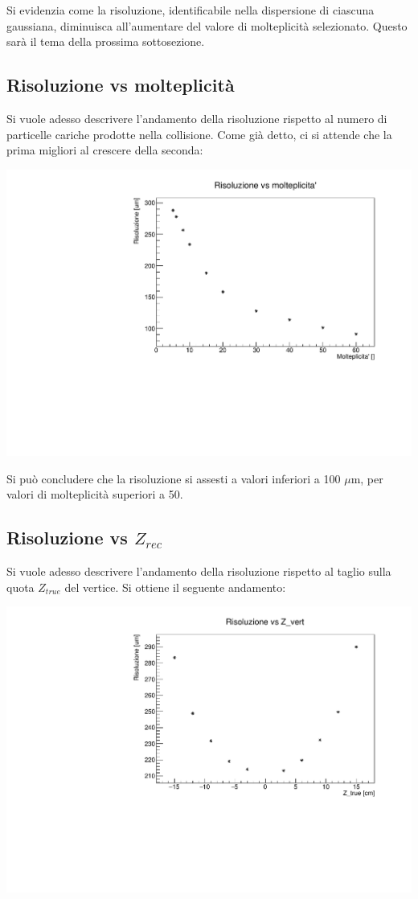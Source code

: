 \documentclass{article}
\begin{document}
\begin{figure} [H]
    \label{fig:foobar}
\end{figure}

Si evidenzia come la risoluzione, identificabile nella dispersione di ciascuna gaussiana, diminuisca all'aumentare del valore di molteplicità selezionato. Questo sarà il tema della prossima sottosezione. 

\subsection{Risoluzione vs molteplicità}
Si vuole adesso descrivere l'andamento della risoluzione rispetto al numero di particelle cariche prodotte nella collisione. Come già detto, ci si attende che la prima migliori al crescere della seconda:

\begin{center}
    	\includegraphics[width=0.55\linewidth]{images/ris_vs_mul.pdf}
\end{center}

Si può concludere che la risoluzione si assesti a valori inferiori a 100 $\mu$m, per valori di molteplicità superiori a 50.

\subsection{Risoluzione vs $Z_{rec}$}
Si vuole adesso descrivere l'andamento della risoluzione rispetto al taglio sulla quota $Z_{true}$ del vertice. Si ottiene il seguente andamento: 

\begin{center}
    	\includegraphics[width=0.55\linewidth]{images/ris_vs_Z.pdf}
\end{center}
\end{document}
